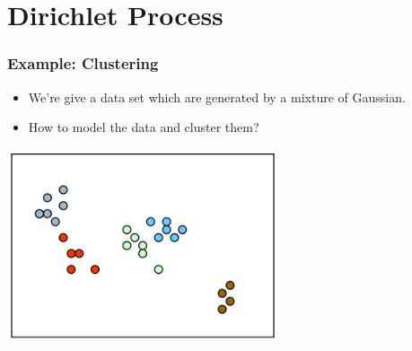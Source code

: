 \documentclass{beamer}
\begin{document}
\section{Dirichlet Process}
\begin{frame}
	\frametitle{Example: Clustering}
	\begin{itemize}
		\item We're give a data set which are generated by a mixture of Gaussian.
		\item How to model the data and cluster them?
	\end{itemize}
	\centering
	\includegraphics[width=0.6\textwidth]{img/motive.png}
\end{frame}
\end{document}
